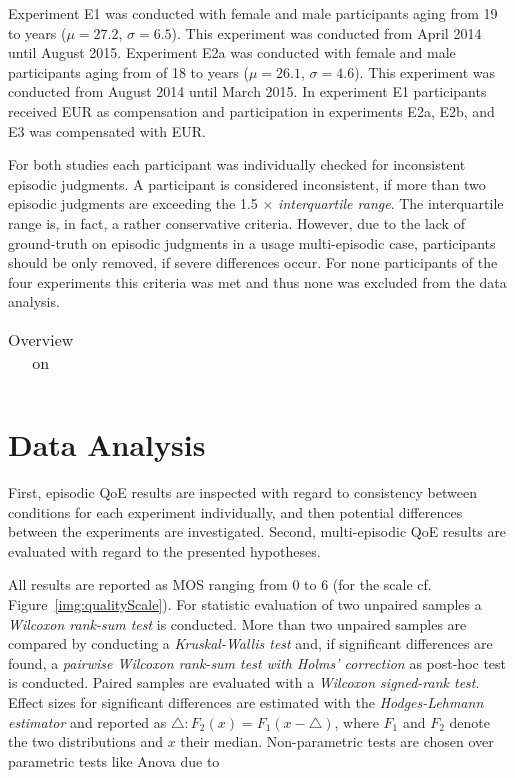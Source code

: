 Experiment E1 was conducted  with \unit[59]{female} and \unit[40]{male} participants aging from 19 to \unit[53]{years} ($\mu=27.2$, $\sigma=6.5$).
This experiment was conducted from April 2014 until August 2015.
Experiment E2a was conducted with \unit[65]{female} and \unit[35]{male} participants aging from of 18 to \unit[50]{years} ($\mu=26.1$, $\sigma=4.6$).
This experiment was conducted from August 2014 until March 2015.
In experiment E1 participants received \unit[15]{EUR} as compensation and participation in experiments E2a, E2b, and E3 was compensated with \unit[10]{EUR}.

For both studies each participant was individually checked for inconsistent episodic judgments.
A participant is considered inconsistent, if more than two episodic judgments are exceeding the 1.5 $\times$ \emph{interquartile range}. %
The interquartile range is, in fact, a rather conservative criteria.
However, due to the lack of ground-truth on episodic judgments in a usage multi-episodic case, participants should be only removed, if severe differences occur.
For none participants of the four experiments this criteria was met and thus none was excluded from the data analysis.

\begin{table}
	\begin{tabular}{c|c|c|c}
	
	\end{tabular}
	\caption{Overview on }
\end{table}

\section{Data Analysis}
First, episodic QoE results are inspected with regard to consistency between conditions for each experiment individually, and then potential differences between the experiments are investigated.
Second, multi-episodic QoE results are evaluated with regard to the presented hypotheses.

All results are reported as \ac{MOS} ranging from 0 to 6 (for the scale cf. Figure~\ref{img:qualityScale}).
For statistic evaluation of two unpaired samples a \emph{Wilcoxon rank-sum test} is conducted.
More than two unpaired samples are compared by conducting a \emph{Kruskal-Wallis test} and, if significant differences are found, a \emph{pairwise Wilcoxon rank-sum test with Holms' correction} as post-hoc test is conducted.
Paired samples are evaluated with a \emph{Wilcoxon signed-rank test}.
Effect sizes for significant differences are estimated with the \emph{Hodges-Lehmann estimator} and reported as $\triangle: F_{2}(x)=F_{1}(x-\triangle)$, where
$F_{1}$ and $F_{2}$ denote the two distributions and $x$ their median.
Non-parametric tests are chosen over parametric tests like Anova due to 


